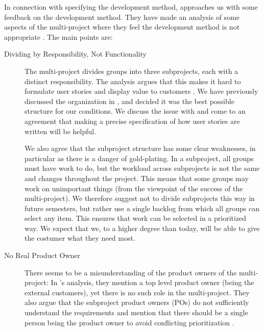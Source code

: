 In connection with specifying the development method,  approaches us with some feedback on the development method. They have made an analysis of some aspects of the multi-project where they feel the development method is not appropriate \cite{processanalysis}. The main points are: 
\begin{description}
  \item[Dividing by Responsibility, Not Functionality] The multi-project divides groups into three subprojects, each with a distinct responsibility. The analysis argues that this makes it hard to formulate user stories and display value to customers \cite{processanalysis}. We have previously discussed the organization in , and decided it was the best possible structure for our conditions. We discuss the issue with  and come to an agreement that making a precise specification of how user stories are written will be helpful.

We also agree that the subproject structure has some clear weaknesses, in particular as there is a danger of gold-plating. In a subproject, all groups must have work to do, but the workload across subprojects is not the same and changes throughout the project. This means that some groups may work on unimportant things (from the viewpoint of the success of the multi-project). We therefore suggest not to divide subprojects this way in future semesters, but rather use a single backlog from which all groups can select any item. This ensures that work can be selected in a prioritized way. We expect that we, to a higher degree than today, will be able to give the costumer what they need most.
  \item[No Real Product Owner] There seems to be a misunderstanding of the product owners of the multi-project: In 's analysis, they mention a top level product owner (being the external customers), yet there is no such role in the multi-project. They also argue that the subproject product owners (POs) do not sufficiently understand the requirements and mention that there should be a single person being the product owner to avoid conflicting prioritization \cite{processanalysis}.


\end{description}
